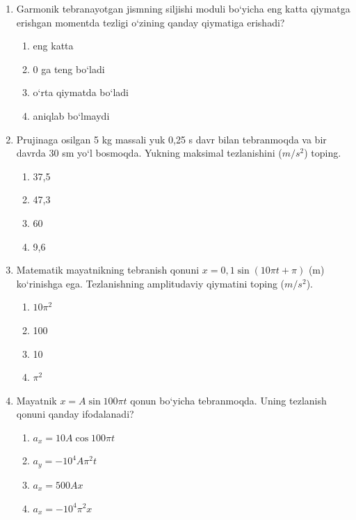 \begin{enumerate}
\item Garmonik tebranayotgan jismning siljishi moduli bo‘yicha eng katta qiymatga erishgan momentda tezligi o‘zining qanday qiymatiga erishadi?
\begin{enumerate}[label=\Alph*)]
\item eng katta
\item 0 ga teng bo‘ladi
\item o‘rta qiymatda bo‘ladi
\item aniqlab bo‘lmaydi
\end{enumerate}

\item Prujinaga osilgan 5 kg massali yuk 0,25 s davr bilan tebranmoqda va bir davrda 30 sm yo‘l bosmoqda. Yukning maksimal tezlanishini ($m/s^2$) toping.
\begin{enumerate}[label=\Alph*)]
\item 37,5
\item 47,3
\item 60
\item 9,6
\end{enumerate}

\item Matematik mayatnikning tebranish qonuni $x = 0,1 \sin(10\pi t + \pi)$ (m) ko‘rinishga ega. Tezlanishning amplitudaviy qiymatini toping ($m/s^2$).
\begin{enumerate}[label=\Alph*)]
\item $10\pi^2$
\item 100
\item 10
\item $\pi^2$
\end{enumerate}

\item Mayatnik $x = A \sin 100\pi t$ qonun bo‘yicha tebranmoqda. Uning tezlanish qonuni qanday ifodalanadi?
\begin{enumerate}[label=\Alph*)]
\item $a_x = 10 A \cos 100\pi t$
\item $a_y = -10^4 A \pi^2 t$
\item $a_x = 500 Ax$
\item $a_x = -10^4 \pi^2 x$
\end{enumerate}

\end{enumerate}



